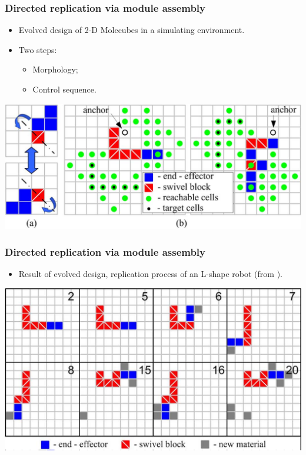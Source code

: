 \documentclass[14pt]{beamer}
\theoremstyle{remark}
\begin{document}
\begin{frame}
  \frametitle{Directed replication via module assembly}
  \begin{itemize}
  	\item Evolved design of 2-D Molecubes in a simulating environment\cite{zykov_evolved_2007}.
  	\item Two steps:
    \begin{itemize}
      \item Morphology;
      \item Control sequence.
    \end{itemize}
	\end{itemize}
	\begin{center}
	  \includegraphics[width=.7\textwidth]{zykov-271}
	\end{center}
\end{frame}

\begin{frame}
  \frametitle{Directed replication via module assembly}
  \begin{itemize}
  	\item Result of evolved design, replication process of an L-shape robot (from \cite{zykov_evolved_2007}).
	\end{itemize}
	\begin{center}
	  \includegraphics[width=.7\textwidth]{zykov-279-a}
	\end{center}
\end{frame}
\end{document}
